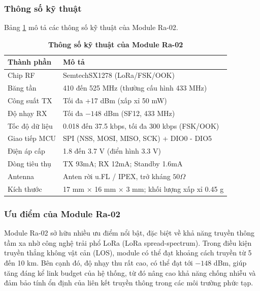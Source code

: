 \documentclass{article}
\begin{document}
	\subsubsection{Thông số kỹ thuật}
	
	Bảng \ref{tab22} mô tả các thông số kỹ thuật của Module Ra-02.
	
	\begin{table}[H]
		\caption[Thông số kỹ thuật của Module Ra-02]{\bfseries \fontsize{12pt}{0pt}\selectfont Thông số kỹ thuật của Module Ra-02}
		\label{tab22}
		\centering
		\begin{tabular}{|p{3.5cm}|p{9.5cm}|}
			\hline
			\textbf{Thành phần} & \textbf{Mô tả} \\ 
			\hline
			Chip RF & SemtechSX1278 (LoRa/FSK/OOK) \\ 
			\hline
			Băng tần & 410 đến 525 MHz (thường cấu hình 433 MHz) \\ 
			\hline
			Công suất TX & Tối đa +17 dBm (xấp xỉ 50 mW) \\ 
			\hline
			Độ nhạy RX & Tối đa $-148$ dBm (SF12, 433 MHz) \\ 
			\hline
			Tốc độ dữ liệu & 0.018 đến 37.5 kbps, tối đa 300 kbps (FSK/OOK) \\ 
			\hline
			Giao tiếp MCU & SPI (NSS, MOSI, MISO, SCK) + DIO0 - DIO5 \\ 
			\hline
			Điện áp cấp & 1.8 đến 3.7 V (điển hình 3.3 V) \\ 
			\hline
			Dòng tiêu thụ & TX 93mA; RX 12mA; Standby 1.6mA \\ 
			\hline
			Antenna & Anten rời u.FL / IPEX, trở kháng $50\Omega$  \\ 
			\hline
			Kích thước & 17 mm × 16 mm × 3 mm; khối lượng xấp xỉ 0.45 g \\ 
			\hline
		\end{tabular}
	\end{table}
	
	\subsubsection{Ưu điểm của Module Ra-02}
	
	Module Ra-02 sở hữu nhiều ưu điểm nổi bật, đặc biệt về khả năng truyền thông tầm xa nhờ công nghệ trải phổ LoRa (LoRa spread-spectrum). Trong điều kiện truyền thẳng không vật cản (LOS), module có thể đạt khoảng cách truyền từ 5 đến 10 km. Bên cạnh đó, độ nhạy thu rất cao, có thể đạt tới $-148$ dBm, giúp tăng đáng kể link budget của hệ thống, từ đó nâng cao khả năng chống nhiễu và đảm bảo tính ổn định của liên kết truyền thông trong các môi trường phức tạp.
	
\end{document}
